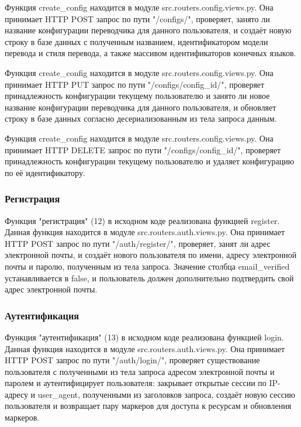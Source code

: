 \documentclass[14pt]{extarticle}
\begin{document}
Функция create\_config находится в модуле src.routers.config.views.py. Она принимает HTTP POST запрос по пути "/configs/", проверяет, занято ли название конфигурации переводчика для данного пользователя, и создаёт новую строку в базе данных с полученным названием, идентификатором модели перевода и стиля перевода, а также массивом идентификаторов конечных языков.

Функция create\_config находится в модуле src.routers.config.views.py. Она принимает HTTP PUT запрос по пути "/configs/{config\_id}/", проверяет принадлежность конфигурации текущему пользователю и занято ли новое название конфигурации переводчика для данного пользователя, и обновляет строку в базе данных согласно десериализованным из тела запроса данным.

Функция create\_config находится в модуле src.routers.config.views.py. Она принимает HTTP DELETE запрос по пути "/configs/{config\_id}/", проверяет принадлежность конфигурации текущему пользователю и удаляет конфигурацию по её идентификатору.

\subsubsection{Регистрация}

Функция "регистрация" (12) в исходном коде реализована функцией register. Данная функция находится в модуле src.routers.auth.views.py. Она принимает HTTP POST запрос по пути "/auth/register/", проверяет, занят ли адрес электронной почты, и создаёт нового пользователя по имени, адресу электронной почты и паролю, полученным из тела запроса. Значение столбца email\_verified устанавливается в false, и пользователь должен дополнительно подтвердить свой адрес электронной почты.

\subsubsection{Аутентификация}

Функция "аутентификация" (13) в исходном коде реализована функцией login. Данная функция находится в модуле src.routers.auth.views.py. Она принимает HTTP POST запрос по пути "/auth/login/", проверяет существование пользователя с полученными из тела запроса адресом электронной почты и паролем и аутентифицирует пользователя: закрывает открытые сессии по IP-адресу и user\_agent, полученными из заголовков запроса, создаёт новую сессию пользователя и возвращает пару маркеров для доступа к ресурсам и обновления маркеров.
\end{document}
